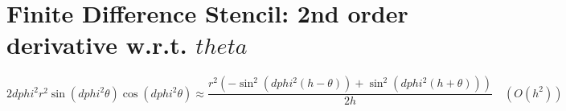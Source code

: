 \documentclass{article}
\begin{document}
\section*{Finite Difference Stencil: 2nd order derivative w.r.t. $theta$}


\[
2 dphi^{2} r^{2} \sin{\left(dphi^{2} \theta \right)} \cos{\left(dphi^{2} \theta \right)} \approx \frac{r^{2} \left(- \sin^{2}{\left(dphi^{2} \left(h - \theta\right) \right)} + \sin^{2}{\left(dphi^{2} \left(h + \theta\right) \right)}\right)}{2 h} \quad (O(h^2))
\]
\end{document}

